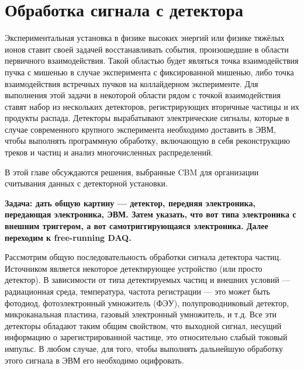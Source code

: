 \section{Обработка сигнала с детектора}\label{sec:secSignalProcessing}

Экспериментальная установка в физике высоких энергий или физике тяжёлых ионов ставит своей задачей восстанавливать события, произошедшие в области первичного взаимодействия. Такой областью будет являться точка взаимодействия пучка с мишенью в случае эксперимента с фиксированной мишенью, либо точка взаимодействия встречных пучков на коллайдерном эксперименте. Для выполнения этой задачи в некоторой области рядом с точкой взаимодействия ставят набор из нескольких детекторов, регистрирующих вторичные частицы и их продукты распада. Детекторы вырабатывают электрические сигналы, которые в случае современного крупного эксперимента необходимо доставить в ЭВМ, чтобы выполнять программную обработку, включающую в себя реконструкцию треков и частиц и анализ многочисленных распределений.


В этой главе обсуждаются решения, выбранные CBM для организации считывания данных с детекторной установки.

\textbf{Задача: дать общую картину --- детектор, передняя электроника, передающая электроника, ЭВМ. Затем указать, что вот типа электроника с внешним триггером, а вот самотриггирующаяся электроника. Далее переходим к free-running DAQ.}

Рассмотрим общую последовательность обработки сигнала детектора частиц.
Источником является некоторое детектирующее устройство (или просто детектор). В зависимости от типа детектируемых частиц и внешних условий --- радиационная среда, температура, частота регистрации --- это может быть фотодиод, фотоэлектронный умножитель (ФЭУ), полупроводниковый детектор, микроканальная пластина, газовый электронный умножитель, и т.д. Все эти детекторы обладают таким общим свойством, что выходной сигнал, несущий информацию о зарегистрированной частице, это относительно слабый токовый импульс. В любом случае, для того, чтобы выполнять дальнейшую обработку этого сигнала в ЭВМ его необходимо оцифровать.

